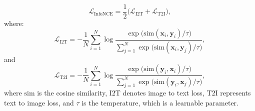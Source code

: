 \begin{equation}
\label{eq.infonce}
\mathcal{L}_{\text{InfoNCE}} = \frac{1}{2} \Big( \mathcal{L}_{\text{I2T}} + \mathcal{L}_{\text{T2I}} \Big),
\end{equation}
where:
\begin{equation}
\label{eq.infonce-i2t}
\mathcal{L}_{\text{I2T}} = -\frac{1}{N} \sum_{i=1}^N \log \frac{\exp\big( \text{sim}(\mathbf{x}_i, \mathbf{y}_i) / \tau \big)}{\sum_{j=1}^N \exp\big( \text{sim}(\mathbf{x}_i, \mathbf{y}_j) / \tau \big)},
\end{equation}
and
\begin{equation}
\label{eq.infonce-t2i}
\mathcal{L}_{\text{T2I}} = -\frac{1}{N} \sum_{i=1}^N \log \frac{\exp\big( \text{sim}(\mathbf{y}_i, \mathbf{x}_i) / \tau \big)}{\sum_{j=1}^N \exp\big( \text{sim}(\mathbf{y}_i, \mathbf{x}_j) / \tau \big)},
\end{equation}
where $\text{sim}$ is the cosine similarity,  $\text{I2T}$ denotes image to text loss, $\text{T2I}$ represents text to image loss, and $\tau$ is the temperature, which is a learnable parameter. 







